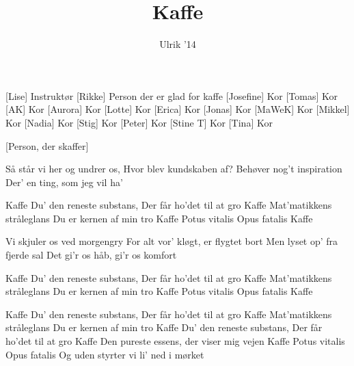 \documentclass[a4paper,11pt]{article}
\title{Kaffe}
\author{Ulrik '14}
\begin{document}
\maketitle

\begin{roles}
[Lise] Instruktør
[Rikke] Person der er glad for kaffe
[Josefine] Kor
[Tomas] Kor
[AK] Kor
[Aurora] Kor
[Lotte] Kor
[Erica] Kor
[Jonas] Kor
[MaWeK] Kor
[Mikkel] Kor
[Nadia] Kor
[Stig] Kor
[Peter] Kor
[Stine T] Kor
[Tina] Kor

\end{roles}

\begin{props}
[Person, der skaffer]
\end{props}


\begin{song}
 Så står vi her og undrer os,
          Hvor blev kundskaben af?
          Behøver nog't inspiration
          Der' en ting, som jeg vil ha'

 Kaffe
          Du' den reneste substans,
          Der får ho'det til at gro
          Kaffe
          Mat'matikkens stråleglans
          Du er kernen af min tro
          Kaffe
          Potus vitalis
          Opus fatalis
          Kaffe
          
 Vi skjuler os ved morgengry
          For alt vor' kløgt, er flygtet bort
          Men lyset op' fra fjerde sal
          Det gi'r os håb, gi'r os komfort

 Kaffe 
          Du' den reneste substans,
          Der får ho'det til at gro
          Kaffe 
          Mat'matikkens stråleglans
          Du er kernen af min tro
          Kaffe 
          Potus vitalis
          Opus fatalis
          Kaffe 

 
 Kaffe 
          Du' den reneste substans,
          Der får ho'det til at gro
          Kaffe 
          Mat'matikkens stråleglans
          Du er kernen af min tro
          Kaffe 
          Du' den reneste substans,
          Der får ho'det til at gro
          Kaffe
          Den pureste essens, der viser mig vejen
          Kaffe
          Potus vitalis
          Opus fatalis
          Og uden styrter vi li' ned i mørket

          
\end{song}
\end{document}
